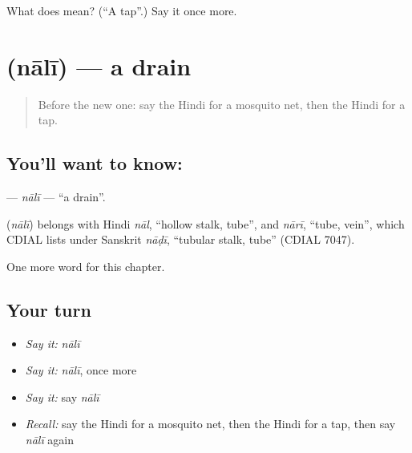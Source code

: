 \begin{tcolorbox}[breakable,colback=teal!4,colframe=teal!35!black,title={Before you move on}]
What does  mean? (\textquotedblleft{}A tap\textquotedblright{}.) Say it once more.
\end{tcolorbox}
\section[\texorpdfstring{\hi{नाली} (nālī)}{नाली (nālī)}]{ (nālī) — a drain}

\label{lesson:HI-C267-nali}



\begin{quote}
Before the new one: say the Hindi for a mosquito net, then the Hindi for a tap.
\end{quote}

\subsection*{You'll want to know: }
\textbf{} — \emph{nālī} — \textquotedblleft{}a drain\textquotedblright{}.

\begin{cousinweb}
\textbf{} (\emph{nālī}) belongs with Hindi \emph{nāl}, \textquotedblleft{}hollow stalk, tube\textquotedblright{}, and \emph{nārī}, \textquotedblleft{}tube, vein\textquotedblright{}, which CDIAL lists under Sanskrit \emph{nāḍī}, \textquotedblleft{}tubular stalk, tube\textquotedblright{} (CDIAL 7047).
\end{cousinweb}

\begin{grammarlens}[title={What you've built}]
One more word for this chapter.
\end{grammarlens}

\subsection*{Your turn}
\begin{itemize}
\raggedright
  \item \emph{Say it:} \emph{nālī}
  \item \emph{Say it:} \emph{nālī}, once more
  \item \emph{Say it:} say \emph{nālī}
  \item \emph{Recall:} say the Hindi for a mosquito net, then the Hindi for a tap, then say \emph{nālī} again
\end{itemize}


